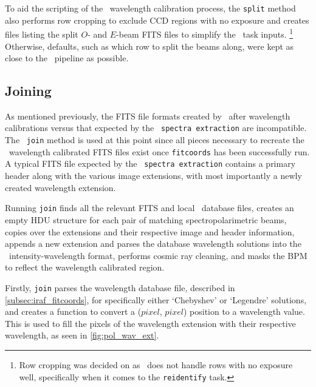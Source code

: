 To aid the scripting of the \iraf\ wavelength calibration process, the \texttt{split} method also performs row cropping to exclude \gls{CCD} regions with no exposure and creates files listing the split $O$- and $E$-beam \gls{FITS} files to simplify the \iraf\ task inputs.%
\footnote{Row cropping was decided on as \iraf\ does not handle rows with no exposure well, specifically when it comes to the \texttt{reidentify} task.}
Otherwise, defaults, such as which row to split the beams along, were kept as close to the \polsalt\ pipeline as possible.

\subsection{Joining} \label{subsec:stops_join}



As mentioned previously, the \gls{FITS} file formats created by \iraf\ after wavelength calibrations versus that expected by the \polsalt\ \texttt{spectra extraction} are incompatible. The \stops\ \texttt{join} method is used at this point since all pieces necessary to recreate the \polsalt\ wavelength calibrated \gls{FITS} files exist once \texttt{fitcoords} has been successfully run. A typical \gls{FITS} file expected by the \polsalt\ \texttt{spectra extraction} contains a primary header along with the various image extensions, with most importantly a newly created wavelength extension.

Running \texttt{join} finds all the relevant \gls{FITS} and local \iraf\ database files, creates an empty \gls{HDU} structure for each pair of matching spectropolarimetric beams, copies over the extensions and their respective image and header information, appends a new extension and parses the database wavelength solutions into the \polsalt\ intensity-wavelength format, performs cosmic ray cleaning, and masks the \gls{BPM} to reflect the wavelength calibrated region.

Firstly, \texttt{join} parses the wavelength database file, described in \autoref{subsec:iraf_fitcoords}, for specifically either `Chebyshev' or `Legendre' solutions, and creates a function to convert a ($pixel$, $pixel$) position to a wavelength value. This is used to fill the pixels of the wavelength extension with their respective wavelength, as seen in \autoref{fig:pol_wav_ext}.

